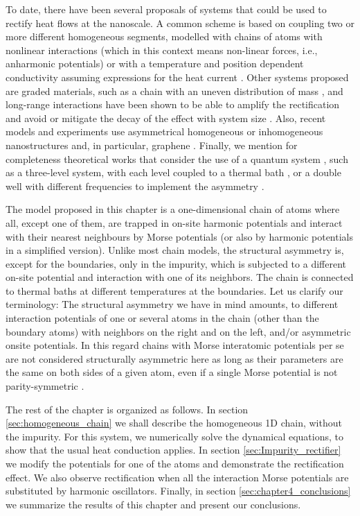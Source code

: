 To date, there have been several proposals of systems that could be used to rectify heat flows at the nanoscale.
A common scheme is based on coupling two or more different homogeneous segments, modelled with
chains of atoms with nonlinear interactions (which in this context means non-linear forces, i.e., anharmonic potentials) \cite{Terraneo2002,Li2004,Hu2006,Peyrard2006,Benenti2016}
or with a temperature and position dependent
conductivity assuming expressions for the heat current \cite{Peyrard2006,Hu2006a}. Other systems proposed are graded materials, such as a chain with an uneven distribution of mass \cite{Chang2006,Zeng2008,Chen2015}, and long-range interactions  have been shown to be able to amplify the rectification and avoid or mitigate the decay of the effect with system size \cite{Pereira2013,Chen2015}. Also, recent models and experiments use asymmetrical homogeneous or inhomogeneous nanostructures and, in particular, graphene  \cite{Wang2014,Wang2017}. Finally, we mention for completeness theoretical works that consider the use of a quantum system \cite{Roberts2011}, such as a three-level system, with each level coupled to a thermal bath \cite{Joulain2016}, or a double well with different frequencies to implement the asymmetry \cite{Katz2016}.

The model proposed in this chapter is a one-dimensional chain of atoms where all, except one of them, are trapped in on-site harmonic potentials and interact with their nearest neighbours by Morse potentials (or also by harmonic
potentials in a simplified version). Unlike most chain models, the structural asymmetry is, except for the boundaries,
only in the impurity, which is subjected to a different on-site potential and interaction with one of its neighbors. The chain is connected to thermal baths at different temperatures at the boundaries. Let us clarify our terminology:
The structural asymmetry we have in mind amounts,
to different interaction potentials of one or several atoms in the chain (other than the boundary atoms) with neighbors on the right and on the left, and/or asymmetric onsite potentials. In this regard  chains with Morse interatomic potentials per se are not considered structurally asymmetric here as long as their parameters are the same on both sides of a given atom, even if a single Morse potential is not parity-symmetric \cite{Wang2015}.

The rest of the chapter is organized as follows. In section \ref{sec:homogeneous_chain} we shall describe the homogeneous 1D chain, without the impurity.  For this system, we numerically solve the dynamical equations, to show that the usual heat conduction applies. In section \ref{sec:Impurity_rectifier} we modify the potentials for one of the atoms and demonstrate the rectification effect. We also observe rectification when all the interaction Morse potentials are substituted by harmonic oscillators. Finally, in section \ref{sec:chapter4_conclusions} we summarize the results of this chapter and present our conclusions.


